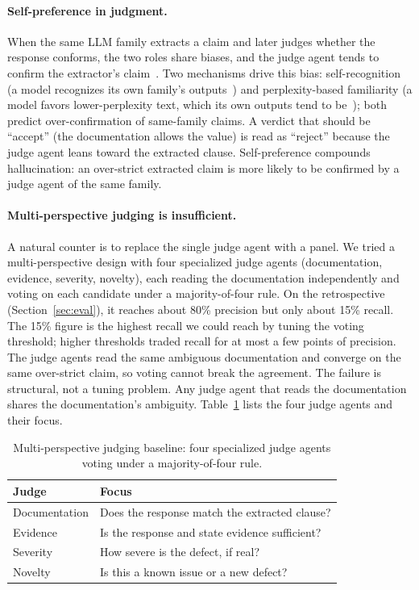\documentclass[sigconf]{acmart}
\begin{document}
\paragraph{Self-preference in judgment.}
When the same LLM family extracts a claim and later judges whether the response conforms, the two roles share biases, and the judge agent tends to confirm the extractor's claim~\cite{panickssery24,wataoka24}. Two mechanisms drive this bias: self-recognition (a model recognizes its own family's outputs~\cite{panickssery24}) and perplexity-based familiarity (a model favors lower-perplexity text, which its own outputs tend to be~\cite{wataoka24}); both predict over-confirmation of same-family claims. A verdict that should be ``accept'' (the documentation allows the value) is read as ``reject'' because the judge agent leans toward the extracted clause. Self-preference compounds hallucination: an over-strict extracted claim is more likely to be confirmed by a judge agent of the same family.

\paragraph{Multi-perspective judging is insufficient.}
A natural counter is to replace the single judge agent with a panel. We tried a multi-perspective design with four specialized judge agents (documentation, evidence, severity, novelty), each reading the documentation independently and voting on each candidate under a majority-of-four rule. On the retrospective (Section~\ref{sec:eval}), it reaches about 80\% precision but only about 15\% recall. The 15\% figure is the highest recall we could reach by tuning the voting threshold; higher thresholds traded recall for at most a few points of precision. The judge agents read the same ambiguous documentation and converge on the same over-strict claim, so voting cannot break the agreement. The failure is structural, not a tuning problem. Any judge agent that reads the documentation shares the documentation's ambiguity. Table~\ref{tab:multipersp} lists the four judge agents and their focus.

\begin{table}[t]
\caption{Multi-perspective judging baseline: four specialized judge agents voting under a majority-of-four rule.}
\label{tab:multipersp}
\small
\begin{tabular}{@{}lp{}@{}}
\toprule
Judge & Focus \\
\midrule
Documentation & Does the response match the extracted clause? \\
Evidence & Is the response and state evidence sufficient? \\
Severity & How severe is the defect, if real? \\
Novelty & Is this a known issue or a new defect? \\
\bottomrule
\end{tabular}
\end{table}
\end{document}

